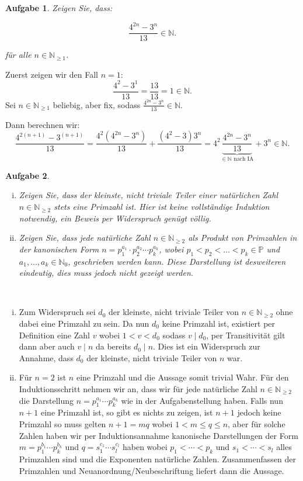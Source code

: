 \documentclass[a4paper, 20]{exam}
\newtheorem{ex}{Aufgabe}
\newcommand\NN{\mathbb{N}}
\begin{document}
\begin{ex}
Zeigen Sie, dass:

$$ \frac{4^{2n}-3^n}{13} \in \NN .$$

f\"ur alle $n \in \NN_{\geq 1}$.
\end{ex}
\begin{solution}
Zuerst zeigen wir den Fall $n=1$:
$$ \frac{4^{2}-3^1}{13} = \frac{13}{13}=1 \in \NN.$$
Sei $n\in \NN_{\geq 1}$ beliebig, aber fix, sodass $ \frac{4^{2n}-3^n}{13} \in \NN $.

Dann berechnen wir:
$$ \frac{4^{2(n+1)}-3^{(n+1)}}{13} = \frac{4^2(4^{2n}-3^n)}{13} + \frac{(4^2-3)3^n}{13}
= 4^2 \underbrace{\frac{4^{2n}-3^n}{13}}_{\in \NN \text{ nach IA}} + 3^n \in \NN.$$
\end{solution}
\begin{ex} \
 \begin{enumerate}[i)]
 \item Zeigen Sie, dass der kleinste, nicht triviale Teiler einer natürlichen Zahl $n \in \mathbb{N}_{ \geq 2}$ stets eine Primzahl ist. Hier ist keine vollständige Induktion notwendig, ein Beweis per Widerspruch genügt völlig. 
 \item Zeigen Sie, dass jede natürliche Zahl $n \in \mathbb{N}_{ \geq 2}$ als Produkt von Primzahlen in der kanonischen Form $n=p_1^{a_1} \cdot p_2^{a_2} \cdots p_k^{a_k}$, wobei $p_1 < p_2 < \dots < p_k \in \mathbb{P}$ und $a_1, \dots , a_k  \in \mathbb{N}_0$, geschrieben werden kann. Diese Darstellung ist desweiteren eindeutig, dies muss jedoch nicht gezeigt werden. 
\end{enumerate}
\end{ex}
\begin{solution} \
\begin{enumerate}[i)] 
\item Zum Widerspruch sei $d_0$ der kleinste,  nicht triviale Teiler von $n \in \mathbb{N}_{ \geq 2}$ ohne dabei eine Primzahl zu sein. Da nun $d_0$ keine Primzahl ist, existiert per Definition eine Zahl $v$ wobei $1<v<d_0$ sodass $v \mid d_0$, per Transitivität gilt dann aber auch $v \mid n$ da bereits $d_0 \mid n$. Dies ist ein Widerspruch zur Annahme, dass $d_0$ der kleinste, nicht triviale Teiler von $n$ war. 

\item Für $n=2$ ist $n$ eine Primzahl und die Aussage somit trivial Wahr. Für den Induktionsschritt nehmen wir an,  dass wir für jede natürliche Zahl $n \in \mathbb{N}_{ \geq 2}$ die Darstellung $n = p_1^{a_1} \cdots p_k^{a_k}$ wie in der Aufgabenstellung haben. Falls nun $n+1$ eine Primzahl ist, so gibt es nichts zu zeigen,  ist $n+1$ jedoch keine Primzahl so muss gelten $n+1=mq$ wobei $1< m \leq q \leq n$, aber für solche Zahlen haben wir per Induktionsannahme kanonische Darstellungen der Form $m =  p_1^{b_1} \cdots p_k^{b_k}$ und $q= s_1^{c_1} \cdots s_l^{c_l}$ haben wobei $p_1 < \cdots < p_k$ und $s_1 < \cdots < s_l$ alles Primzahlen sind und die Exponenten natürliche Zahlen. Zusammenfassen der Primzahlen und Neuanordnung/Neubeschriftung liefert dann die Aussage. 
\end{enumerate}
\end{solution}
\end{document}

